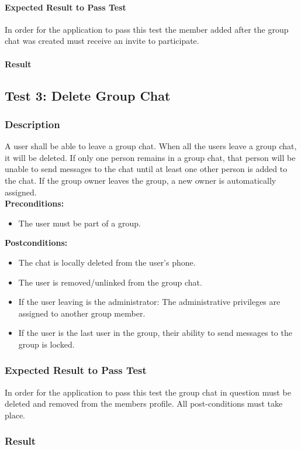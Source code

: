 \documentclass[11pt]{article}
\begin{document}
\paragraph{Expected Result to Pass Test}
In order for the application to pass this test the member added after the group chat was created must receive an invite to participate.
\paragraph{Result}

\subsection{Test 3: Delete Group Chat}
\subsubsection{Description}
A user shall be able to leave a group chat. When all the users leave a group chat, it will be deleted. If only one person remains in a group chat, that person will be unable to send messages to the chat until at least one other person is added to the chat. If the group owner leaves the group, a new owner is automatically assigned.\\
\textbf{Preconditions:} 
\begin{itemize}
\item The user must be part of a group.
\end{itemize}
\textbf{Postconditions:}
\begin{itemize}
\item The chat is locally deleted from the user's phone.
\item The user is removed/unlinked from the group chat.
\item If the user leaving is the administrator: The administrative privileges are assigned to another group member.
\item If the user is the last user in the group, their ability to send messages  to the group is locked.
\end{itemize}
\subsubsection{Expected Result to Pass Test}
In order for the application to pass this test the group chat in question must be deleted and removed from the members profile. All post-conditions must take place.
\subsubsection{Result}
\end{document}
